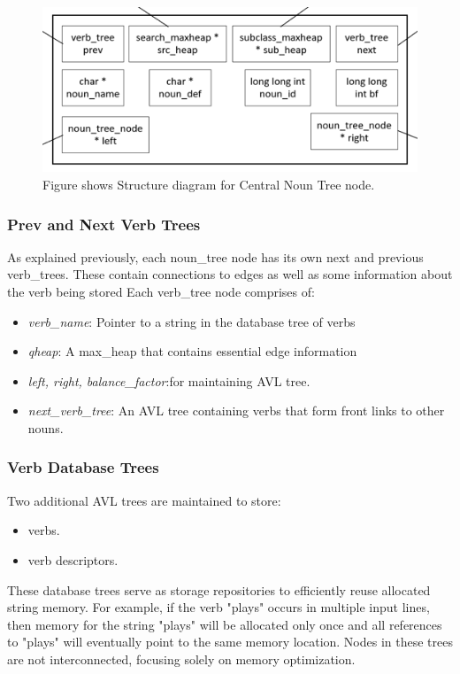 \documentclass[conference]{IEEEtran}
\begin{document}
\begin{figure}[htbp]
\centering
\includegraphics[width=0.8\linewidth]{noun_tree_node_pointer_diagram.png} %
\caption{Figure shows Structure diagram for Central Noun Tree node.}
\label{fig}
\end{figure}

\subsubsection{\textbf{Prev and Next Verb Trees}}
As explained previously, each noun\_tree node has its own next and previous verb\_trees. These contain connections to edges as well as some information about the verb being stored
Each verb\_tree node comprises of:

\begin{itemize}

    \item \textit{verb\_name}: Pointer to a string in the database tree of verbs
    \item \textit{qheap}: A max\_heap that contains essential edge information
    \item \textit{left, right, balance\_factor}:for maintaining AVL tree. 
    \item \textit{next\_verb\_tree}: An AVL tree containing verbs that form front links to other nouns.
    
\end{itemize}

\subsubsection{\textbf{Verb Database Trees}}
Two additional AVL trees are maintained to store:
\begin{itemize}
    \item verbs.
    \item verb descriptors.
\end{itemize}
These database trees serve as storage repositories to efficiently reuse allocated string memory. 
For example, if the verb "plays" occurs in multiple input lines, then memory for the string "plays" will be allocated only once and all references to "plays" will eventually point to the same memory location. 
Nodes in these trees are not interconnected, focusing solely on memory optimization.
\end{document}

